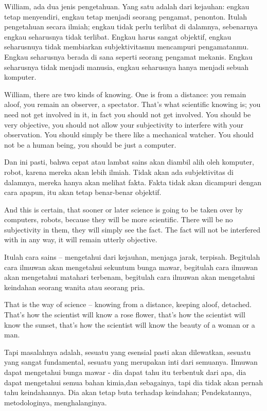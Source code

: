 \bahasa
William, ada dua jenis pengetahuan. Yang satu adalah dari kejauhan: engkau tetap menyendiri, engkau tetap menjadi seorang pengamat, penonton. Itulah pengetahuan secara ilmiah; engkau tidak perlu terlibat di dalamnya, sebenarnya engkau seharusnya tidak terlibat. Engkau harus sangat objektif, engkau seharusnuya tidak membiarkan subjektivitasmu mencampuri pengamatanmu. Engkau seharusnya berada di sana seperti seorang pengamat mekanis. Engkau seharusnya tidak menjadi manusia, engkau seharusnya hanya menjadi sebuah komputer.

\english
William, there are two kinds of knowing. One is from a distance: you remain aloof, you remain an observer, a spectator. That's what scientific knowing is; you need not get involved in it, in fact you should not get involved. You should be very objective, you should not allow your subjectivity to interfere with your observation. You should simply be there like a mechanical watcher. You should not be a human being, you should be just a computer.

\bahasa
Dan ini pasti, bahwa cepat atau lambat sains akan diambil alih oleh komputer, robot, karena mereka akan lebih ilmiah. Tidak akan ada subjektivitas di dalamnya, mereka hanya akan melihat fakta. Fakta tidak akan dicampuri dengan cara apapun, itu akan tetap benar-benar objektif.

\english
And this is certain, that sooner or later science is going to be taken over by computers, robots, because they will be more scientific. There will be no subjectivity in them, they will simply see the fact. The fact will not be interfered with in any way, it will remain utterly objective.

\bahasa
Itulah cara sains -- mengetahui dari kejauhan, menjaga jarak, terpisah. Begitulah cara ilmuwan akan mengetahui sekuntum bunga mawar, begitulah cara ilmuwan akan mengetahui matahari terbenam, begitulah cara ilmuwan akan mengetahui keindahan seorang wanita atau seorang pria.

\english
That is the way of science -- knowing from a distance, keeping aloof, detached. That's how the scientist will know a rose flower, that's how the scientist will know the sunset, that's how the scientist will know the beauty of a woman or a man.

\bahasa
Tapi masalahnya adalah, sesuatu yang esensial pasti akan dilewatkan, sesuatu yang sangat fundamental, sesuatu yang merupakan inti dari semuanya. Ilmuwan dapat mengetahui bunga mawar - dia dapat tahu itu terbentuk dari apa, dia dapat mengetahui semua bahan kimia,dan sebagainya, tapi dia tidak akan pernah tahu keindahannya. Dia akan tetap buta terhadap keindahan; Pendekatannya, metodologinya, menghalanginya.

